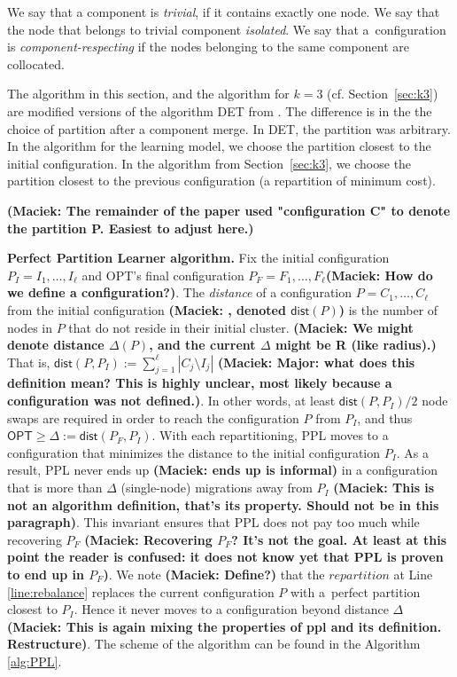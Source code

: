 \documentclass[a4paper,anonymous,USenglish]{lipics-v2019}
\newcommand{\OPT}{\textsf{OPT}\xspace}
\newcommand{\PPL}{\textsf{PPL}\xspace}
\newcommand{\dist}{\textsf{dist}}
\newcommand\maciek[1]{\color{brown}\textbf{(Maciek: #1)}\color{black}}
\begin{document}
We say that a component is \emph{trivial}, if it contains exactly one node.
We say that the node that belongs to trivial component \emph{isolated}.
We say that a~configuration is \emph{component-respecting}
if the nodes belonging to the same component are collocated.

The algorithm in this section, and the algorithm for $k=3$ (cf. Section~\ref{sec:k3}) are modified versions of the algorithm DET from \cite{repartition-disc}.
The difference is in the the choice of partition after a component merge.
In DET, the partition was arbitrary.
In the algorithm for the learning model, we choose the partition closest to the initial configuration.
In the algorithm from Section~\ref{sec:k3}, we choose the partition closest to the previous configuration (a repartition of minimum cost).



\maciek{The remainder of the paper used "configuration C" to denote the partition P. Easiest to adjust here.}

\noindent
\textbf{Perfect Partition Learner algorithm.}
Fix the initial configuration
$P_I = I_1, \dots, I_{\ell}$ and \OPT's final configuration
$P_F = F_1, \dots, F_{\ell}$\maciek{How do we define a configuration?}.
The \emph{distance} of a configuration $P = C_1, \dots, C_{\ell}$ from the initial configuration \maciek{, denoted $\dist(P)$} is the number of nodes in $P$ that do not reside in their initial cluster.
\maciek{We might denote distance $\Delta(P)$, and the current $\Delta$ might be R (like radius).}
That is,
$\dist(P, P_I) := \sum_{j=1}^{\ell} | C_j \setminus I_j |$
\maciek{Major: what does this definition mean? This is highly unclear, most likely because a configuration was not defined.}. 
In other words,
at least $\dist(P, P_I)/2$ node swaps are required in order to reach the configuration $P$ from $P_I$, and thus
$\OPT \geq \Delta:= \dist(P_F, P_I) $.
With each repartitioning,
\PPL moves to a configuration that minimizes the distance to the initial configuration $P_I$.
As a result,
\PPL never ends up \maciek{ends up is informal} in a configuration that is more than $\Delta$ (single-node) migrations away from $P_I$ \maciek{This is not an algorithm definition, that's its property. Should not be in this paragraph}.
This invariant ensures that \PPL does not pay too much while recovering $P_F$ \maciek{Recovering $P_F$? It's not the goal. At least at this point the reader is confused: it does not know yet that PPL is proven to end up in $P_F$}.
We note \maciek{Define?} that the $\mathit{repartition}$ at Line \ref{line:rebalance} replaces the current configuration $P$ with a~perfect partition closest to $P_I$.
Hence it never moves to a configuration beyond distance $\Delta$ \maciek{This is again mixing the properties of ppl and its definition. Restructure}.
The scheme of the algorithm can be found in the Algorithm \ref{alg:PPL}.
\end{document}
